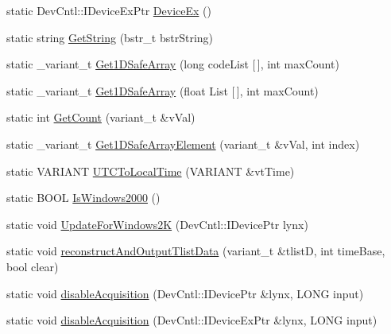 \begin{DoxyCompactItemize}
\item 
static Dev\+Cntl\+::\+I\+Device\+Ex\+Ptr \hyperlink{class_utilities_aeb1fd9dbe82fb50e1abaf8e98c225f3a_aeb1fd9dbe82fb50e1abaf8e98c225f3a}{Device\+Ex} ()
\item 
static string \hyperlink{class_utilities_aae385aedbefa8efffbea68f63569f444_aae385aedbefa8efffbea68f63569f444}{Get\+String} (bstr\+\_\+t bstr\+String)
\item 
static \+\_\+variant\+\_\+t \hyperlink{class_utilities_a647591ab58d508945d0dc80db2101624_a647591ab58d508945d0dc80db2101624}{Get1\+D\+Safe\+Array} (long code\+List \mbox{[}$\,$\mbox{]}, int max\+Count)
\item 
static \+\_\+variant\+\_\+t \hyperlink{class_utilities_a5e839ed4340caa91f50582656f9a9a1b_a5e839ed4340caa91f50582656f9a9a1b}{Get1\+D\+Safe\+Array} (float List \mbox{[}$\,$\mbox{]}, int max\+Count)
\item 
static int \hyperlink{class_utilities_a90940686ffd15fdebcd9ed4751e0048e_a90940686ffd15fdebcd9ed4751e0048e}{Get\+Count} (variant\+\_\+t \&v\+Val)
\item 
static \+\_\+variant\+\_\+t \hyperlink{class_utilities_a63dff5c20c4c0e72d53a07b150ab1ab6_a63dff5c20c4c0e72d53a07b150ab1ab6}{Get1\+D\+Safe\+Array\+Element} (variant\+\_\+t \&v\+Val, int index)
\item 
static V\+A\+R\+I\+A\+NT \hyperlink{class_utilities_a0eec445d3ab7471d967af4d5d9daceaa_a0eec445d3ab7471d967af4d5d9daceaa}{U\+T\+C\+To\+Local\+Time} (V\+A\+R\+I\+A\+NT \&vt\+Time)
\item 
static B\+O\+OL \hyperlink{class_utilities_a5037cc6bc036044928fbb0c4d6d90df9_a5037cc6bc036044928fbb0c4d6d90df9}{Is\+Windows2000} ()
\item 
static void \hyperlink{class_utilities_aa6708b10aa75dcf1e10490914a0eb1b1_aa6708b10aa75dcf1e10490914a0eb1b1}{Update\+For\+Windows2K} (Dev\+Cntl\+::\+I\+Device\+Ptr lynx)
\item 
static void \hyperlink{class_utilities_a1026543ba8c95c142180ad642878671d_a1026543ba8c95c142180ad642878671d}{reconstruct\+And\+Output\+Tlist\+Data} (variant\+\_\+t \&tlistD, int time\+Base, bool clear)
\item 
static void \hyperlink{class_utilities_a1f36dd943490f7df78b01b83056e49c6_a1f36dd943490f7df78b01b83056e49c6}{disable\+Acquisition} (Dev\+Cntl\+::\+I\+Device\+Ptr \&lynx, L\+O\+NG input)
\item 
static void \hyperlink{class_utilities_aa881fc2e3136227f05d6afcc562ad98a_aa881fc2e3136227f05d6afcc562ad98a}{disable\+Acquisition} (Dev\+Cntl\+::\+I\+Device\+Ex\+Ptr \&lynx, L\+O\+NG input)
\end{DoxyCompactItemize}


